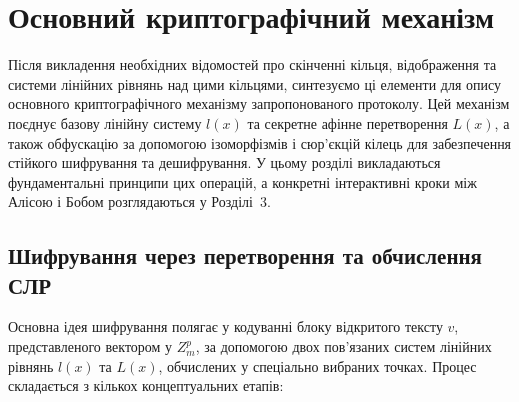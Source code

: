 \section{Основний криптографічний механізм}
\label{sec:core_mechanism}
Після викладення необхідних відомостей про скінченні кільця, відображення та системи лінійних рівнянь над цими кільцями, синтезуємо ці елементи для опису основного криптографічного механізму запропонованого протоколу.
Цей механізм поєднує базову лінійну систему $l(x)$ та секретне афінне перетворення $L(x)$, а також обфускацію за допомогою ізоморфізмів і сюр'єкцій кілець для забезпечення стійкого шифрування та дешифрування.
У цьому розділі викладаються фундаментальні принципи цих операцій, а конкретні інтерактивні кроки між Алісою і Бобом розглядаються у Розділі~3.

\subsection{Шифрування через перетворення та обчислення СЛР}
\label{subsec:encryption_mechanism}
Основна ідея шифрування полягає у кодуванні блоку відкритого тексту $v$, представленого вектором у $Z_m^p$, за допомогою двох пов'язаних систем лінійних рівнянь $l(x)$ та $L(x)$, обчислених у спеціально вибраних точках.
Процес складається з кількох концептуальних етапів:

